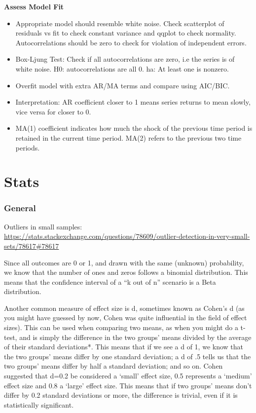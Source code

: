 \documentclass[]{book}
\theoremstyle{definition}
\theoremstyle{definition}
\theoremstyle{definition}
\theoremstyle{remark}
\begin{document}
\textbf{Assess Model Fit}

\begin{itemize}
\item
  Appropriate model should resemble white noise. Check scatterplot of
  residuals vs fit to check constant variance and qqplot to check
  normality. Autocorrelations should be zero to check for violation of
  independent errors.
\item
  Box-Ljung Test: Check if all autocorrelations are zero, i.e the series
  is of white noise. H0: autocorrelations are all 0. ha: At least one is
  nonzero.
\item
  Overfit model with extra AR/MA terms and compare using AIC/BIC.
\item
  Interpretation: AR coefficient closer to 1 means series returns to
  mean slowly, vice versa for closer to 0.
\item
  MA(1) coefficient indicates how much the shock of the previous time
  period is retained in the current time period. MA(2) refers to the
  previous two time periods.
\end{itemize}

\chapter{Stats}\label{stats}

\subsection{General}\label{general-3}

Outliers in small samples:
\url{https://stats.stackexchange.com/questions/78609/outlier-detection-in-very-small-sets/78617\#78617}

Since all outcomes are 0 or 1, and drawn with the same (unknown)
probability, we know that the number of ones and zeros follows a
binomial distribution. This means that the confidence interval of a ``k
out of n'' scenario is a Beta distribution.

Another common measure of effect size is d, sometimes known as Cohen's d
(as you might have guessed by now, Cohen was quite influential in the
field of effect sizes). This can be used when comparing two means, as
when you might do a t-test, and is simply the difference in the two
groups' means divided by the average of their standard deviations*. This
means that if we see a d of 1, we know that the two groups' means differ
by one standard deviation; a d of .5 tells us that the two groups' means
differ by half a standard deviation; and so on. Cohen suggested that
d=0.2 be considered a `small' effect size, 0.5 represents a `medium'
effect size and 0.8 a `large' effect size. This means that if two
groups' means don't differ by 0.2 standard deviations or more, the
difference is trivial, even if it is statistically significant.
\end{document}
